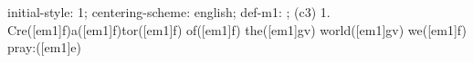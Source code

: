 initial-style: 1;
centering-scheme: english;
def-m1: \grealign;
(c3) 1. Cre([em1]f)a([em1]f)tor([em1]f) of([em1]f) the([em1]gv) world([em1]gv) we([em1]f) pray:([em1]e)
